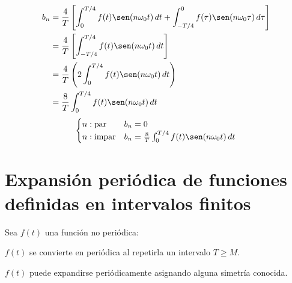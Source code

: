\begin{equation*}
\begin{split}
    b_n
        &=\frac{4}{T}\left[
            \int_0^{T/4} f(t)\sen(n\omega_0 t)\,dt+
            \int_{-T/4}^0 f(\tau)\sen(n\omega_0\tau)\,d\tau
        \right]\\
        &=\frac{4}{T}\left[\int_{-T/4}^{T/4} f(t)\sen(n\omega_0 t)\,dt\right]\\
        &=\frac{4}{T}\left(2\int_0^{T/4} f(t)\sen(n\omega_0 t)\,dt\right)\\
        &=\frac{8}{T}\int_0^{T/4} f(t)\sen(n\omega_0 t)\,dt\\
\end{split}
\end{equation*}
\begin{equation}
\begin{cases}
    n: \text{par}   &b_n=0\\
    n: \text{impar} &b_n=\frac{8}{T}\int_0^{T/4}f(t)\sen(n\omega_0 t)\,dt\\
\end{cases}
\end{equation}

\section{Expansión periódica de funciones definidas en intervalos finitos}
Sea $f(t)$ una función no periódica:
\begin{figure}[H]
    \centering
    
\end{figure}

$f(t)$ se convierte en periódica al repetirla un intervalo $T\geq M$.
\begin{figure}[H]
    \centering
    
\end{figure}

$f(t)$ puede expandirse periódicamente asignando alguna simetría conocida.

